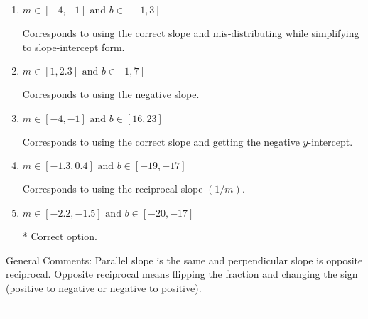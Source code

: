 \documentclass{article}[10pt]
\begin{document}
\begin{enumerate}[label=\Alph*.] 
\item $ m \in [-4, -1] \text{ and } b \in [-1, 3] $ 

  Corresponds to using the correct slope and mis-distributing while simplifying to slope-intercept form. 
\item $ m \in [1, 2.3] \text{ and } b \in [1, 7] $ 

  Corresponds to using the negative slope. 
\item $ m \in [-4, -1] \text{ and } b \in [16, 23] $ 

  Corresponds to using the correct slope and getting the negative $y$-intercept. 
\item $ m \in [-1.3, 0.4] \text{ and } b \in [-19, -17] $ 

  Corresponds to using the reciprocal slope $(1/m)$. 
\item $ m \in [-2.2, -1.5] \text{ and } b \in [-20, -17] $ 

 * Correct option. 
\end{enumerate} 
 
General Comments: Parallel slope is the same and perpendicular slope is opposite reciprocal. Opposite reciprocal means flipping the fraction and changing the sign (positive to negative or negative to positive).

-----------------------------------------------
\end{document}
